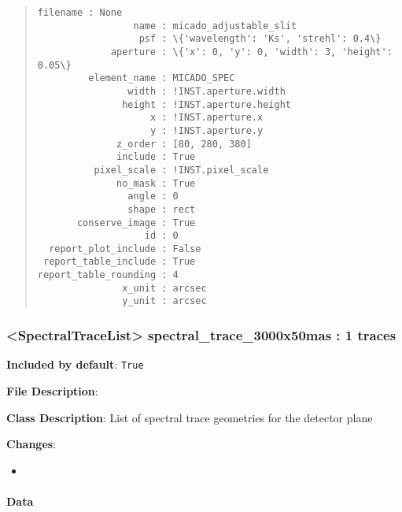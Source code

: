 \begin{quote}
\begin{alltt}
\begin{lstlisting}[frame=single]
             filename : None
                 name : micado_adjustable_slit
                  psf : \{'wavelength': 'Ks', 'strehl': 0.4\}
             aperture : \{'x': 0, 'y': 0, 'width': 3, 'height': 0.05\}
         element_name : MICADO_SPEC
                width : !INST.aperture.width
               height : !INST.aperture.height
                    x : !INST.aperture.x
                    y : !INST.aperture.y
              z_order : [80, 280, 380]
              include : True
          pixel_scale : !INST.pixel_scale
              no_mask : True
                angle : 0
                shape : rect
       conserve_image : True
                   id : 0
  report_plot_include : False
 report_table_include : True
report_table_rounding : 4
               x_unit : arcsec
               y_unit : arcsec
\end{lstlisting}
\end{alltt}
\end{quote}


\subsubsection{<SpectralTraceList> \textquotedbl{}spectral\_trace\_3000x50mas\textquotedbl{} : 1 traces%
  \label{spectraltracelist-spectral-trace-3000x50mas-1-traces}%
}

\textbf{Included by default}: \texttt{True}

\textbf{File Description}:

\textbf{Class Description}: List of spectral trace geometries for the detector plane

\textbf{Changes}:

\begin{itemize}
\item \end{itemize}


\paragraph{Data%
  \label{id1}%
}

\begin{figure}[H]
\noindent{}\label{fig-spectral-trace-3000x50mas}
\end{figure}


